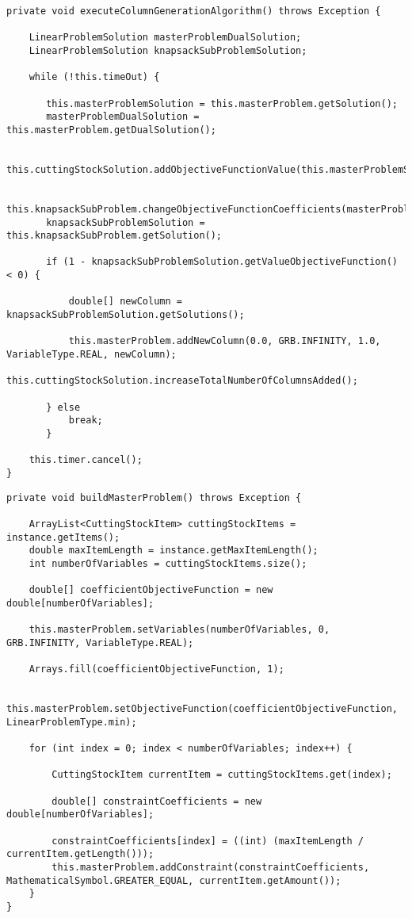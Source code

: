 \documentclass[10pt,a4paper]{article}
\begin{document}
\begin{lstlisting}[frame=lines, caption={\texttt{executeColumnGenerationAlgorithm()} method implementation.}, label={code:cga}]
private void executeColumnGenerationAlgorithm() throws Exception {

    LinearProblemSolution masterProblemDualSolution;
    LinearProblemSolution knapsackSubProblemSolution;

    while (!this.timeOut) {

       this.masterProblemSolution = this.masterProblem.getSolution();
       masterProblemDualSolution = this.masterProblem.getDualSolution();

       this.cuttingStockSolution.addObjectiveFunctionValue(this.masterProblemSolution.getValueObjectiveFunction());

       this.knapsackSubProblem.changeObjectiveFunctionCoefficients(masterProblemDualSolution.getSolutions());
       knapsackSubProblemSolution = this.knapsackSubProblem.getSolution();

       if (1 - knapsackSubProblemSolution.getValueObjectiveFunction() < 0) {

           double[] newColumn = knapsackSubProblemSolution.getSolutions();

           this.masterProblem.addNewColumn(0.0, GRB.INFINITY, 1.0, VariableType.REAL, newColumn);
           this.cuttingStockSolution.increaseTotalNumberOfColumnsAdded();

       } else
           break;
       }

    this.timer.cancel();
}
\end{lstlisting}

\begin{lstlisting}[frame=lines, caption={\texttt{buildMasterProblem()} method implementation.}, label={code:cga}]
private void buildMasterProblem() throws Exception {

    ArrayList<CuttingStockItem> cuttingStockItems = instance.getItems();
    double maxItemLength = instance.getMaxItemLength();
    int numberOfVariables = cuttingStockItems.size();

    double[] coefficientObjectiveFunction = new double[numberOfVariables];

    this.masterProblem.setVariables(numberOfVariables, 0, GRB.INFINITY, VariableType.REAL);

    Arrays.fill(coefficientObjectiveFunction, 1);

    this.masterProblem.setObjectiveFunction(coefficientObjectiveFunction, LinearProblemType.min);

    for (int index = 0; index < numberOfVariables; index++) {

        CuttingStockItem currentItem = cuttingStockItems.get(index);

        double[] constraintCoefficients = new double[numberOfVariables];

        constraintCoefficients[index] = ((int) (maxItemLength / currentItem.getLength()));
        this.masterProblem.addConstraint(constraintCoefficients, MathematicalSymbol.GREATER_EQUAL, currentItem.getAmount());
    }
}
\end{lstlisting}
\end{document}
